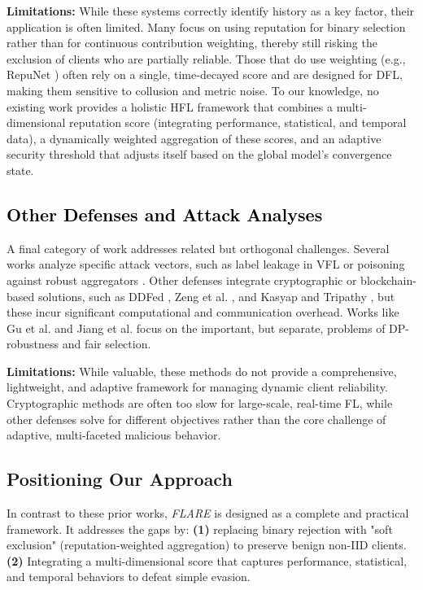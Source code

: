 \documentclass[lettersize,journal]{IEEEtran}
\begin{document}
\textbf{Limitations:} While these systems correctly identify history as a key factor, their application is often limited. Many focus on using reputation for binary selection \cite{al2023reputation, tan2022reputation} rather than for continuous contribution weighting, thereby still risking the exclusion of clients who are partially reliable. Those that do use weighting (e.g., RepuNet \cite{penalva2025repunet}) often rely on a single, time-decayed score and are designed for DFL, making them sensitive to collusion and metric noise. To our knowledge, no existing work provides a holistic HFL framework that combines a multi-dimensional reputation score (integrating performance, statistical, and temporal data), a dynamically weighted aggregation of these scores, and an adaptive security threshold that adjusts itself based on the global model's convergence state.


\subsection{\textcolor{black}{Other Defenses and Attack Analyses}}
A final category of work addresses related but orthogonal challenges. Several works analyze specific attack vectors, such as label leakage in VFL \cite{fu2022label} or poisoning against robust aggregators \cite{fang2020local}. Other defenses integrate cryptographic or blockchain-based solutions, such as DDFed \cite{xu2024dual}, Zeng et al. \cite{10536902}, and Kasyap and Tripathy \cite{kasyap2024privacy}, but these incur significant computational and communication overhead. Works like Gu et al. \cite{gu2023dp} and Jiang et al. \cite{jiang2024lotto} focus on the important, but separate, problems of DP-robustness and fair selection.

\textbf{Limitations:} While valuable, these methods do not provide a comprehensive, lightweight, and adaptive framework for managing dynamic client reliability. Cryptographic methods are often too slow for large-scale, real-time FL, while other defenses solve for different objectives rather than the core challenge of adaptive, multi-faceted malicious behavior.


\subsection{Positioning Our Approach}
In contrast to these prior works, \textit{FLARE} is designed as a complete and practical framework. It addresses the gaps by: \textbf{(1)} replacing binary rejection with "soft exclusion" (reputation-weighted aggregation) to preserve benign non-IID clients. \textbf{(2)} Integrating a multi-dimensional score that captures performance, statistical, and temporal behaviors to defeat simple evasion. 
\end{document}
